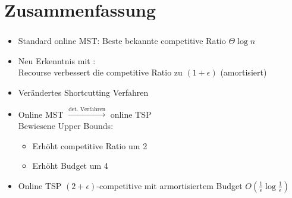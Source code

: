 \section{Zusammenfassung}

\begin{frame}
	\frametitle{\insertsection}
	\begin{itemize}
		\itemsep\setlength{1em}
		\item Standard online MST: Beste bekannte competitive Ratio $\Theta{\log n}$
		\item Neu Erkenntnis mit \cite{recourse2016}:\\Recourse verbessert die competitive Ratio zu \underline{$(1+\epsilon)$} (amortisiert)
		\item Verändertes Shortcutting Verfahren
		\item Online MST $\xrightarrow{\text{det. Verfahren}}$ online TSP\\
		Bewiesene Upper Bounds:
		\vspace{1em}
		\begin{itemize}
			\itemsep\setlength{.7em}
			\item Erhöht competitive Ratio um 2
			\item Erhöht Budget um 4
		\end{itemize}
		\item Online TSP $(2+\epsilon)$-competitive mit armortisiertem Budget $O(\frac{1}{\epsilon}\log\frac{1}{\epsilon})$
	\end{itemize}
\end{frame}